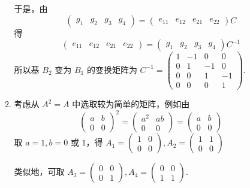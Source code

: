 \begin{enumerate}
\begin{enumerate}
        于是，由 \[\begin{pmatrix}g_1 & g_2 & g_3 & g_4\end{pmatrix}=\begin{pmatrix}e_{11} & e_{12} & e_{21} & e_{22}\end{pmatrix}C\]
        得 \[\begin{pmatrix}e_{11} & e_{12} & e_{21} & e_{22}\end{pmatrix}=\begin{pmatrix}g_1 & g_2 & g_3 & g_4\end{pmatrix}C^{-1}\]
        所以基 $B_2$ 变为 $B_1$ 的变换矩阵为 $C^{-1}=\begin{pmatrix}1 & -1 & 0 & 0 \\ 0 & 1 & -1 & 0 \\ 0 & 0 & 1 & -1 \\ 0 & 0 & 0 & 1\end{pmatrix}$.
        \item 考虑从 $A^2=A$ 中选取较为简单的矩阵，例如由
        \[\begin{pmatrix}a & b \\ 0 & 0\end{pmatrix}^2=\begin{pmatrix}a^2 & ab \\ 0 & 0\end{pmatrix}=\begin{pmatrix}a & b \\ 0 & 0\end{pmatrix}\]
        取 $a=1,b=0$ 或 $1$，得 $A_1=\begin{pmatrix}1 & 0 \\ 0 & 0\end{pmatrix},A_2=\begin{pmatrix}1 & 1 \\ 0 & 0\end{pmatrix}$

        类似地，可取 $A_3=\begin{pmatrix}0 & 0 \\ 0 & 1\end{pmatrix},A_4=\begin{pmatrix}0 & 0 \\ 1 & 1\end{pmatrix}$.


\end{enumerate}
\end{enumerate}
